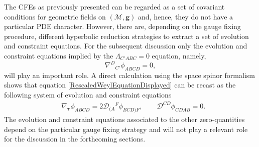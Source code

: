 \documentclass[10pt,a4paper]{article}
\theoremstyle{plain}
\def\bmg{{\bm g}}
\newcounter{mnotecount}%
\newcommand{\mnotex}[1]%
{\protect{\stepcounter{mnotecount}}$^{\mbox{\footnotesize $\bullet$\themnotecount}}$ 
\marginpar{%
\raggedright\tiny\em
$\!\!\!\!\!\!\,\bullet$\themnotecount: #1} }
\begin{document}
The CFEs as previously presented can be regarded as a set of covariant
conditions for geometric fields on $(\mathcal{M},\bmg)$ and, hence,
they do not have a particular PDE character.  However, there are,
depending on the gauge fixing procedure, different hyperbolic
reduction strategies to extract a set of evolution and constraint
equations.  For the subsequent discussion only the evolution and
constraint equations implied by the $\Lambda_{C'ABC}=0$ equation, namely,
\begin{equation}\label{RescaledWeylEquationDisplayed}
 \nabla^D{}_{C'}\phi _{ABCD}=0,
\end{equation}
will play an important role.  A direct calculation using
the space spinor formalism
shows that equation \eqref{RescaledWeylEquationDisplayed}
can be recast as the following system
of evolution and constraint equations
\begin{align}\label{RescaledWeyl_evo_const}
  & \nabla_{\bm\tau} \phi _{ABCD} = 2 \mathcal{D} _{(A}{}^{F}\phi_{BCD)F},
  \qquad \mathcal{D} ^{CD}\phi _{CDAB} = 0.
\end{align}
The evolution and constraint equations associated to the other
zero-quantities depend on the particular gauge fixing strategy and
will not play a relevant role for the discussion in the forthcoming
sections.
\medskip
\end{document}

